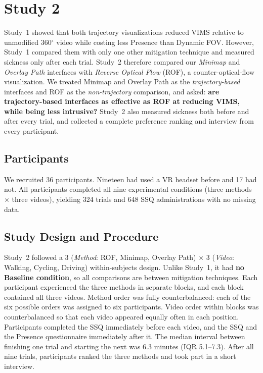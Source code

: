 
\section{Study 2}
\label{sec:study2}

Study~1 showed that both trajectory visualizations reduced VIMS relative to
unmodified 360$^\circ$ video while costing less Presence than Dynamic FOV.
However, Study~1 compared them with only one other mitigation technique and
measured sickness only after each trial. Study~2 therefore compared our
\textit{Minimap} and \textit{Overlay Path} interfaces with \textit{Reverse
Optical Flow} (ROF), a counter-optical-flow visualization. We treated Minimap
and Overlay Path as the \emph{trajectory-based} interfaces and ROF as the
\emph{non-trajectory} comparison, and asked: \textbf{are trajectory-based
interfaces as effective as ROF at reducing VIMS, while being less intrusive?}
Study~2 also measured sickness both before and after every trial, and
collected a complete preference ranking and interview from every participant.

\subsection{Participants}

We recruited 36 participants. %
Nineteen had used a VR headset before and 17 had not. All participants
completed all nine experimental conditions (three methods $\times$ three
videos), yielding 324 trials and 648 SSQ administrations with no missing data.

\subsection{Study Design and Procedure}

Study~2 followed a 3 (\textit{Method}: ROF, Minimap, Overlay Path) $\times$ 3
(\textit{Video}: Walking, Cycling, Driving) within-subjects design. Unlike
Study~1, it had \textbf{no Baseline condition}, so all comparisons are between
mitigation techniques. Each participant experienced the three methods in
separate blocks, and each block contained all three videos. Method order was
fully counterbalanced: each of the six possible orders was assigned to six
participants. Video order within blocks was counterbalanced so that each video
appeared equally often in each position. Participants completed the SSQ
immediately before each video, and the SSQ and the Presence questionnaire
immediately after it. The median interval between finishing one trial and
starting the next was 6.3 minutes (IQR 5.1--7.3). After all nine trials,
participants ranked the three methods and took part in a short interview.

